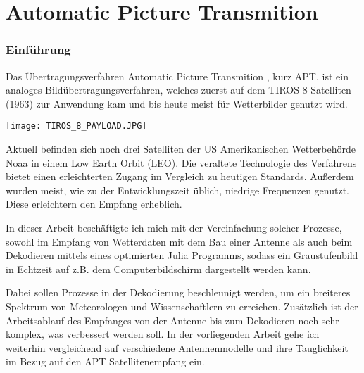 \part{\glqq Automatic Picture Transmition\grqq}
\section[Charakteristiken]{Einführung}
\begin{multicols}{2}

    Das Übertragungsverfahren \glqq Automatic Picture Transmition \grqq , kurz APT, ist ein analoges Bildübertragungsverfahren, welches zuerst auf dem TIROS-8 Satelliten (1963) zur Anwendung kam und bis heute meist für Wetterbilder genutzt wird. 
    
    \begin{center}
        \centering
        \texttt{[image: TIROS\_8\_PAYLOAD.JPG]}
    \end{center}
    
    Aktuell befinden sich noch drei Satelliten der US Amerikanischen Wetterbehörde Noaa in einem \glqq Low Earth Orbit \grqq (LEO). Die veraltete Technologie des Verfahrens bietet einen erleichterten Zugang im Vergleich zu heutigen Standards. Außerdem wurden meist, wie zu der Entwicklungszeit üblich, niedrige Frequenzen genutzt. Diese erleichtern den Empfang erheblich.
    
    In dieser Arbeit beschäftigte ich mich mit der Vereinfachung solcher Prozesse, sowohl im Empfang von Wetterdaten mit dem Bau einer Antenne als auch beim Dekodieren mittels eines optimierten Julia Programms, sodass ein Graustufenbild in Echtzeit auf z.B. dem Computerbildschirm dargestellt werden kann.
    
    Dabei sollen Prozesse in der Dekodierung beschleunigt werden, um ein breiteres Spektrum von Meteorologen und Wissenschaftlern zu erreichen. Zusätzlich ist der Arbeitsablauf des Empfanges von der Antenne bis zum Dekodieren noch sehr komplex, was verbessert werden soll. In der vorliegenden Arbeit gehe ich weiterhin vergleichend auf verschiedene Antennenmodelle und ihre Tauglichkeit im Bezug auf den APT Satellitenempfang ein. 
    

\end{multicols}

